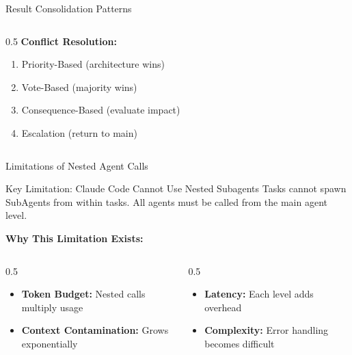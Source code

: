 \documentclass[aspectratio=169,11pt]{beamer}
\begin{document}
\begin{frame}{Result Consolidation Patterns}
\begin{columns}[T]
\begin{column}{0.5\textwidth}
            \vspace{0.3cm}
            \textbf{Conflict Resolution:}
            \begin{enumerate}
                \item Priority-Based (architecture wins)
                \item Vote-Based (majority wins)
                \item Consequence-Based (evaluate impact)
                \item Escalation (return to main)
            \end{enumerate}
        \end{column}
    \end{columns}
\end{frame}

\begin{frame}{Limitations of Nested Agent Calls}
    \begin{alertblock}{Key Limitation: Claude Code Cannot Use Nested Subagents}
        Tasks cannot spawn SubAgents from within tasks. All agents must be called from the main agent level.
    \end{alertblock}

    \vspace{0.2cm}
    \textbf{Why This Limitation Exists:}
    \begin{columns}[T]
        \begin{column}{0.5\textwidth}
            \begin{itemize}
                \item \textbf{Token Budget:} Nested calls multiply usage
                \item \textbf{Context Contamination:} Grows exponentially
            \end{itemize}
        \end{column}
        \begin{column}{0.5\textwidth}
            \begin{itemize}
                \item \textbf{Latency:} Each level adds overhead
                \item \textbf{Complexity:} Error handling becomes difficult
            \end{itemize}
        \end{column}
    \end{columns}


\end{frame}
\end{document}
